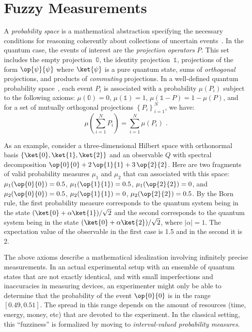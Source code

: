 \documentclass[english,reprint, aps, prl,superscriptaddress, showpacs,
showkeys, longbibliography, amsmath, amssymb]{revtex4-1}
\theoremstyle{plain}
\theoremstyle{definition}
\newcommand{\proj}[1]{\op{#1}{#1}}
\begin{document}
\section{Fuzzy Measurements}
 
A \emph{probability space} is a mathematical abstraction specifying
the necessary conditions for reasoning coherently about collections of
uncertain events~\cite{Kolmogorov1950}.  In the quantum case, the
events of interest are the \emph{projection operators} $P$. This set
includes the empty projection~$\mathbb{0}$, the identity
projection~$\mathbb{1}$, projections of the form $\proj{\psi}$ where
$\ket{\psi}$ is a pure quantum state, sums of \emph{orthogonal}
projections, and products of \emph{commuting} projections. In a
well-defined quantum probability
space~\cite{10.2307/2308516,gleason1957,Redhead1987-REDINA,Maassen2010},
each event $P_i$ is associated with a probability $\mu(P_i)$ subject
to the following axioms: $\mu(\mathbb{0})=0$, $\mu(\mathbb{1})=1$,
$\mu\left(\mathbb{1}-P\right)=1-\mu\left(P\right)$, and for a set of
mutually orthogonal projections $\left\{ P_{i}\right\} _{i=1}^{N}$, we
have:
\begin{equation}
\mu\left(\sum_{i=1}^{N}P_{i}\right)=
\sum_{i=1}^{N}\mu\left(P_{i}\right)
\textrm{ .}\label{eq:QuantumProbability-Addition}
\end{equation}

As an example, consider a three-dimensional Hilbert space with
orthonormal basis $\{\ket{0},\ket{1},\ket{2}\}$ and an observable $Q$
with spectral decomposition $\proj{0} + 2\,\proj{1} +
3\,\proj{2}$. Here are two fragments of valid probability measures
$\mu_1$ and $\mu_2$ that can associated with this space:
$\mu_1(\proj{0}) = 0.5$, $\mu_1(\proj{1}) = 0.5$,
$\mu_1(\proj{2}) = 0$, and $\mu_2(\proj{0}) = 0.5$,
$\mu_2(\proj{1}) = 0$, $\mu_2(\proj{2}) = 0.5$. By the Born rule,
the first probability measure corresponds to the quantum system being
in the state $(\ket{0}+\alpha\ket{1})/\sqrt{2}$ and the second corresponds
to the quantum system being in the state
$(\ket{0}+\alpha\ket{2})/\sqrt{2}$, where $|\alpha|=1$. The expectation value
of the observable in the first case is 1.5 and in the second it is 2.

The above axioms describe a mathematical idealization involving
infinitely precise measurements. In an actual experimental setup with
an ensemble of quantum states that are not exactly identical, and with
small imperfections and inaccuracies in measuring devices, an
experimenter might only be able to determine that the probability of
the event $\proj{0}$ is in the range $[0.49,0.51]$. The spread in this
range depends on the amount of resources (time, energy, money, etc)
that are devoted to the experiment. In the classical setting, this
``fuzziness'' is formalized by moving to \emph{interval-valued
  probability measures}.
\end{document}
